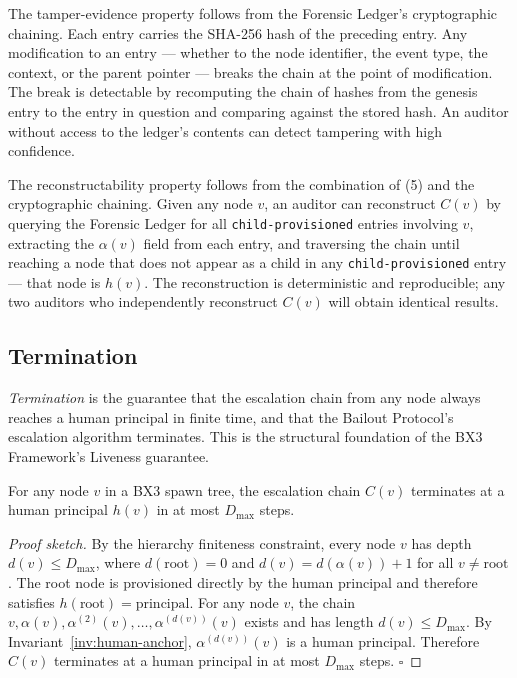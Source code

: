 The tamper-evidence property follows from the Forensic Ledger's cryptographic
chaining. Each entry carries the SHA-256 hash of the preceding entry. Any
modification to an entry — whether to the node identifier, the event type, the
context, or the parent pointer — breaks the chain at the point of modification.
The break is detectable by recomputing the chain of hashes from the genesis
entry to the entry in question and comparing against the stored hash. An auditor
without access to the ledger's contents can detect tampering with high
confidence.

The reconstructability property follows from the combination of (5) and the
cryptographic chaining. Given any node $v$, an auditor can reconstruct $C(v)$
by querying the Forensic Ledger for all \texttt{child-provisioned} entries
involving $v$, extracting the $\alpha(v)$ field from each entry, and traversing
the chain until reaching a node that does not appear as a child in any
\texttt{child-provisioned} entry — that node is $h(v)$. The reconstruction is
deterministic and reproducible; any two auditors who independently reconstruct
$C(v)$ will obtain identical results.

\subsection{Termination}
\label{sec:termination}

\textit{Termination} is the guarantee that the escalation chain from any node
always reaches a human principal in finite time, and that the Bailout Protocol's
escalation algorithm terminates. This is the structural foundation of the BX3
Framework's Liveness guarantee.

\begin{property}
\label{prop:finite-termination}
For any node $v$ in a BX3 spawn tree, the escalation chain $C(v)$ terminates at
a human principal $h(v)$ in at most $D_{\max}$ steps.
\end{property}

\begin{proof}[Proof sketch]
By the hierarchy finiteness constraint, every node $v$ has depth
$d(v) \leq D_{\max}$, where $d(\text{root}) = 0$ and $d(v) = d(\alpha(v)) + 1$
for all $v \neq \text{root}$. The root node is provisioned directly by the
human principal and therefore satisfies $h(\text{root}) = \text{principal}$.
For any node $v$, the chain $v, \alpha(v), \alpha^{(2)}(v), \ldots,
\alpha^{(d(v))}(v)$ exists and has length $d(v) \leq D_{\max}$. By
Invariant~\ref{inv:human-anchor}, $\alpha^{(d(v))}(v)$ is a human principal.
Therefore $C(v)$ terminates at a human principal in at most $D_{\max}$ steps.
$\square$
\end{proof}

